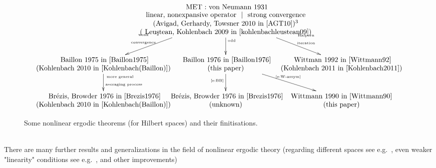 \begin{figure}[htb]%
\[
\begin{xy}
  \xymatrix@C=-50pt@M=3pt{
  		  & \txt{ MET : von Neumann  1931 \\ linear, nonexpansive operator $\ |\ $ strong convergence\\(Avigad, Gerhardy, Towsner 2010 in~\cite{AGT10})\footnotemark\\ ( Leu{\c{s}}tean, Kohlenbach 2009 in~\cite{kohlenbachleustean09})
 		  } \ar[dl]_-{\txt{\tiny weak\\\tiny convergence}} \ar[d]^{\txt{\tiny odd}} \ar[dr]^-{\txt{\tiny $ $\hspace{2ex} Halpern\\ \tiny $ $\hspace{2ex} iteration}} &  \\
        \txt{ 					Baillon 1975 in~\cite{Baillon1975} \\ (Kohlenbach 2010 in~\cite{Kohlenbach(Baillon)})} \ar[d]^{\txt{\tiny more general\hspace{5ex}$ $\\ \vspace{-7pt}\tiny averaging process}} &  
        \txt{ Baillon 1976 in~\cite{Baillon1976} \\ (this paper) } \ar[d]_{\txt{\tiny \eqref{e:BB}}} \ar[dr]^{\txt{\tiny \eqref{e:W-assym}}} &  
        \txt{ Wittman 1992 in~\cite{Wittmann92} \\ (Kohlenbach 2011 in~\cite{Kohlenbach2011})}        \\
         \txt{ Br\'ezis, Browder 1976 in~\cite{Brezis1976} \\ (Kohlenbach 2010 in~\cite{Kohlenbach(Baillon)}) }  & \txt{ Br\'ezis, Browder 1976 in~\cite{Brezis1976} \\ (unknown) } & \txt{Wittmann 1990 in~\cite{Wittmann90} \\ (this paper)} &   
   }
\end{xy}
\]
\caption{Some nonlinear ergodic theorems (for Hilbert spaces) and their finitisations.}%
\label{f:METtree}
\end{figure}
 \\					
There are many further results and generalizations
in the field of nonlinear ergodic theory 
(regarding different spaces see e.g.~\cite{Bruck1979,Hirano1982}, even weaker "linearity" conditions see e.g.~\cite{Miyadera1997,Rouhani2001}, and other improvements) 
